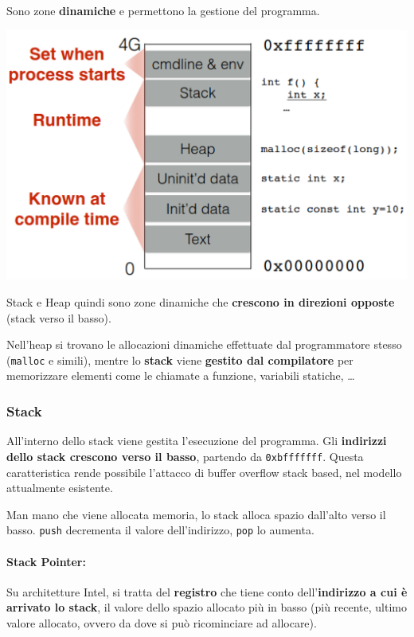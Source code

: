 Sono zone \textbf{dinamiche} e permettono la gestione del programma.
\begin{center}
	\includegraphics[width=0.75\linewidth]{img/sme/memory_all1}
\end{center}

Stack e Heap quindi sono zone dinamiche che \textbf{crescono in direzioni opposte} (stack verso il basso).

Nell'heap si trovano le allocazioni dinamiche effettuate dal programmatore stesso (\texttt{malloc} e simili), mentre lo \textbf{stack} viene \textbf{gestito dal compilatore} per memorizzare elementi come le chiamate a funzione, variabili statiche, \dots 

\subsubsection{Stack}

All'interno dello stack viene gestita l'esecuzione del programma. Gli \textbf{indirizzi dello stack crescono verso il basso}, partendo da \texttt{0xbfffffff}. Questa caratteristica rende possibile l'attacco di buffer overflow stack based, nel modello attualmente esistente.

Man mano che viene allocata memoria, lo stack alloca spazio dall'alto verso il basso. \texttt{push} decrementa il valore dell'indirizzo, \texttt{pop} lo aumenta.

\paragraph{Stack Pointer:} Su architetture Intel, si tratta del \textbf{registro} che tiene conto dell'\textbf{indirizzo a cui è arrivato lo stack}, il valore dello spazio allocato più in basso (più recente, ultimo valore allocato, ovvero da dove si può ricominciare ad allocare).

